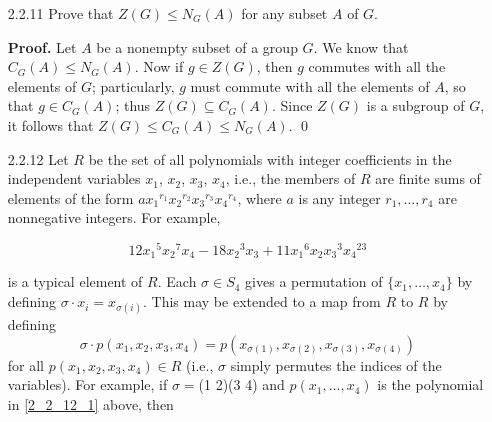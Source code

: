 \begin{enumerate}
      \textbf{Proof.} Since $|H| = 2$, there exists a nonidentity $h \in G$ such
      that $H = \{1, h\}$. From the discussion in the textbook, we know that
      $C_G(H) \subseteq N_G(H)$, so it suffices to show reverse containment. Now
      let $g \in N_G(H)$. Then it follows that
      $$H = gHg^{-1} = \{g1g^{-1}, ghg^{-1}\} = \{1, ghg^{-1}\}.$$
      That is, $ghg^{-1} = h$ so that $gh = hg$. Thus $g$ commutes with both 1
      and $h$ so that $g \in C_G(H)$(so that $N_G(H) \subseteq C_G(H)$ and we 
      have that $N_G(H) = C_G(H)$. Now suppose that $N_G(H) = G$. Then, as we
      have just shown, we must have that $C_G(H) = G$. That is, every element of
      $G$ commutes with every element of $H$; in order words, every element of
      $H$ commutes with every element of $G$, so that $H \le Z(G)$. \qed
   \item[2.2.11]  Prove that $Z(G) \le N_G(A)$ for any subset $A$ of $G$.

      \textbf{Proof.} Let $A$ be a nonempty subset of a group $G$. We know that
      $C_G(A) \le N_G(A)$. Now if $g \in Z(G)$, then $g$ commutes with all the
      elements of $G$; particularly, $g$ must commute with all the elements of
      $A$, so that $g \in C_G(A)$; thus $Z(G) \subseteq C_G(A)$. Since $Z(G)$ is
      a subgroup of $G$, it follows that $Z(G) \le C_G(A) \le N_G(A)$. \qed
   \item[2.2.12]  Let $R$ be the set of all polynomials with integer
                  coefficients in the independent variables $x_1$, $x_2$, $x_3$,
                  $x_4$, i.e., the members of $R$ are finite sums of elements of
                  the form ${ax_1}^{r_1}{x_2}^{r_2}{x_3}^{r_3}{x_4}^{r_4}$,
                  where $a$ is any integer $r_1, \ldots, r_4$ are nonnegative
                  integers. For example,

                  \begin{equation} \label{2_2_12_1}
                     12{x_1}^5{x_2}^7x_4 - 18{x_2}^3x_3 +
                        11{x_1}^6x_2{x_3}^3{x_4}^{23}
                  \end{equation}

                  is a typical element of $R$. Each $\sigma \in S_4$ gives a
                  permutation of $\{x_1, \ldots, x_4\}$ by defining
                  $\sigma \cdot x_i = x_{\sigma(i)}$. This may be extended to a
                  map from $R$ to $R$ by defining
                  $$\sigma \cdot p(x_1, x_2, x_3, x_4) = p(x_{\sigma(1)},
                    x_{\sigma(2)}, x_{\sigma(3)}, x_{\sigma(4)})$$
                  for all $p(x_1, x_2, x_3, x_4) \in R$ (i.e., $\sigma$ simply
                  permutes the indices of the variables). For example, if
                  $\sigma =$(1 2)(3 4) and $p(x_1, \ldots, x_4)$ is the
                  polynomial in \eqref{2_2_12_1} above, then


\end{enumerate}
